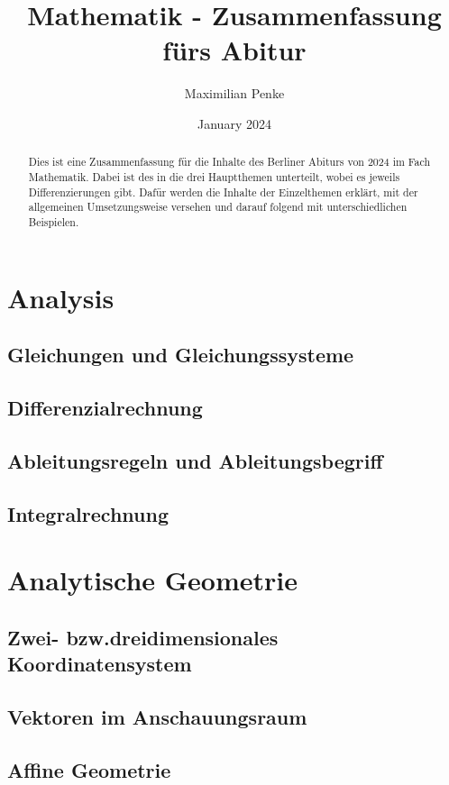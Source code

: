 \documentclass{article}
\title{Mathematik - Zusammenfassung fürs Abitur}
\author{Maximilian Penke}
\date{January 2024}
\begin{document}
    \maketitle

    \begin{abstract}
        Dies ist eine Zusammenfassung für die Inhalte des Berliner Abiturs von 2024 im Fach Mathematik. Dabei ist des in die drei Hauptthemen unterteilt, wobei es jeweils Differenzierungen gibt. Dafür werden die Inhalte der Einzelthemen erklärt, mit der allgemeinen Umsetzungsweise versehen und darauf folgend mit unterschiedlichen Beispielen.
    \end{abstract}

    \tableofcontents

    \section{Analysis}
        \subsection{Gleichungen und Gleichungssysteme}
        \subsection{Differenzialrechnung}
        \subsection{Ableitungsregeln und Ableitungsbegriff}
        \subsection{Integralrechnung}

    \section{Analytische Geometrie}
        \subsection{Zwei- bzw.dreidimensionales Koordinatensystem}
        \subsection{Vektoren im Anschauungsraum}
        \subsection{Affine Geometrie}
\end{document}
